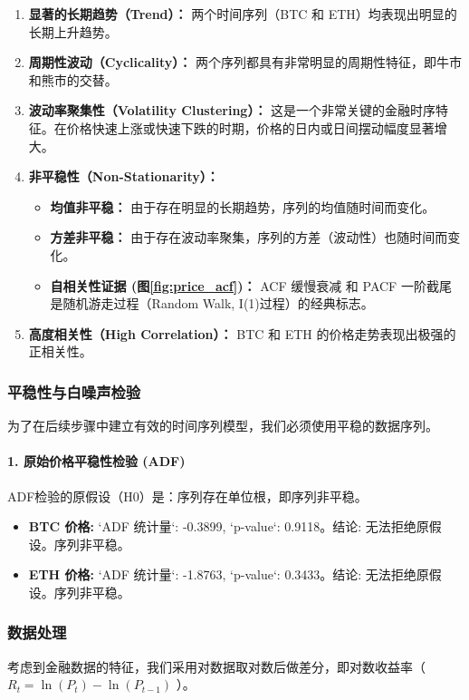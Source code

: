 \documentclass[a4paper]{ctexart}
\begin{document}
	\begin{enumerate}
		\item \textbf{显著的长期趋势（Trend）：} 两个时间序列（BTC 和 ETH）均表现出明显的长期上升趋势。
		\item \textbf{周期性波动（Cyclicality）：} 两个序列都具有非常明显的周期性特征，即牛市和熊市的交替。
		\item \textbf{波动率聚集性（Volatility Clustering）：} 这是一个非常关键的金融时序特征。在价格快速上涨或快速下跌的时期，价格的日内或日间摆动幅度显著增大。
		\item \textbf{非平稳性（Non-Stationarity）：}
		\begin{itemize}
			\item \textbf{均值非平稳：} 由于存在明显的长期趋势，序列的均值随时间而变化。
			\item \textbf{方差非平稳：} 由于存在波动率聚集，序列的方差（波动性）也随时间而变化。
			\item \textbf{自相关性证据 (图\ref{fig:price_acf})：} ACF 缓慢衰减 和 PACF 一阶截尾是随机游走过程（Random Walk, I(1)过程）的经典标志。
		\end{itemize}
		\item \textbf{高度相关性（High Correlation）：} BTC 和 ETH 的价格走势表现出极强的正相关性。
	\end{enumerate}
	
	\subsubsection{平稳性与白噪声检验}
	为了在后续步骤中建立有效的时间序列模型，我们必须使用平稳的数据序列。
	
	\paragraph{1. 原始价格平稳性检验 (ADF)}
	ADF检验的原假设（H0）是：序列存在单位根，即序列非平稳。
	\begin{itemize}
		\item \textbf{BTC 价格:} `ADF 统计量`: -0.3899, `p-value`: 0.9118。结论: 无法拒绝原假设。序列非平稳。
		\item \textbf{ETH 价格:} `ADF 统计量`: -1.8763, `p-value`: 0.3433。结论: 无法拒绝原假设。序列非平稳。
	\end{itemize}
	
	\subsubsection{数据处理}
	考虑到金融数据的特征，我们采用对数据取对数后做差分，即对数收益率（ $R_t = \ln(P_t) - \ln(P_{t-1})$ ）。
	
\end{document}
